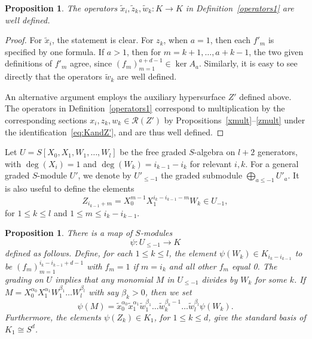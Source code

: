 \documentclass[a4paper,11pt]{amsart}
\theoremstyle{plain}
\newtheorem{proposition}[theorem]{Proposition}
\theoremstyle{definition}
\newcommand{\R}{\mathcal{R}}
\begin{document}
\begin{proposition} \label{prop:opwelldefined}
The operators $\tilde x_i, \tilde z_k, \tilde w_k\colon K\to K$ in Definition~\ref{operators1} are well defined. 
\end{proposition}
\begin{proof} For $\tilde x_i$, the statement is clear. For $z_k$, when $a = 1$, then each $f'_m$ is specified by one formula. If $a > 1$, then for $m = k+1, \dots, a+k-1$, the two given definitions of $f'_m$ agree, since $(f_m)_{m=1}^{a+d-1} \in \ker A_a$. Similarly, it is easy to see directly that the operators $\tilde w_k$ are well defined. 

An alternative argument employs the auxiliary hypersurface $Z'$ defined above. 
The operators in Definition~\ref{operators1} correspond to multiplication by the corresponding sections $x_i, z_k, w_k\in \R(Z')$ by Propositions~\ref{xmult}--\ref{zmult} under the identification~\eqref{eq:KandZ'}, and are thus well defined.  
\end{proof}

Let $U = S[X_0, X_1, W_1,\dots,W_l]$ be the free graded $S$-algebra on $l+2$ generators, with $\deg(X_i)=1$ and $\deg(W_k) = i_{k-1}-i_k$ for relevant $i,k$. For a general graded $S$-module $U'$, we denote by $U'_{\leq -1}$ the graded submodule $\bigoplus_{a\leq -1} U'_{a}$. It is also useful to define the elements
\begin{equation} \label{eqn:ZinXWalg}
Z_{i_{k-1}+m} = X_0^{m-1}X_1^{i_k - i_{k-1}-m}W_k \in U_{-1},
\end{equation}
for $1\leq k \leq l$ and $1 \leq m \leq i_k - i_{k-1}$.

\begin{proposition} \label{prop:psialg}
    There is a map of $S$-modules
    \[
    \psi: U_{\leq -1} \rightarrow K
    \]
    defined as follows. Define, for each $1 \leq k \leq l$, the element $\psi(W_k) \in K_{i_k - i_{k-1}}$ to be $(f_m)_{m=1}^{i_k - i_{k-1} + d -1}$ with $f_m = 1$ if $m = i_k$ and all other $f_m$ equal 0. The grading on $U$ implies that any monomial $M$ in $U_{\leq -1}$ divides by $W_k$ for some $k$. If $M = X_0^{\alpha_0} X_1^{\alpha_1} W_1^{\beta_1}\dots W_l^{\beta_l}$ with say $\beta_k >0$, then we set
    \[
    \psi(M) = \tilde x_0^{\alpha_0} \tilde x_1^{\alpha_1} \tilde w_1^{\beta_1}\dots \tilde w_k^{\beta_k -1} \dots \tilde w_l^{\beta_l} \psi(W_k).
    \]
    Furthermore, the elements $\psi(Z_k) \in K_1$, for $1 \leq k \leq d$, give the standard basis of $K_1 \cong S^d$.
\end{proposition}
\end{document}
